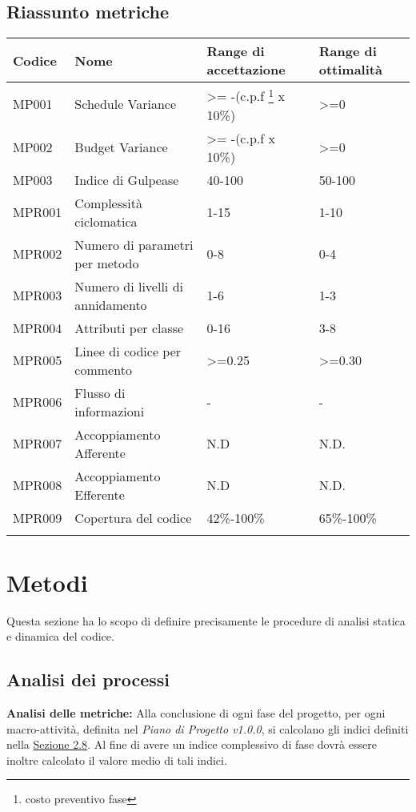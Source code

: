 \subsection{Riassunto metriche}
\begin{center}
\begin{tabularx}{\textwidth}{|X|X|X|X|}

	\hline
	\textbf{Codice} & \textbf{Nome} & 	\textbf{Range di accettazione} & \textbf{Range di ottimalità}\\
	\endhead
	\hline
	MP001 & Schedule Variance& >= -(c.p.f \footnote{costo preventivo fase} x 10\%)& >=0  \\
	\hline
	MP002 & Budget Variance & >= -(c.p.f x 10\%)& >=0 \\
	\hline
	MP003 & Indice di Gulpease & 40-100 & 50-100\\
	\hline
	MPR001 & Complessità ciclomatica & 1-15 & 1-10 \\
	\hline
	MPR002 & Numero di parametri per metodo & 0-8 & 0-4 \\
	\hline
	MPR003 & Numero di livelli di annidamento & 1-6 & 1-3 \\
	\hline
	MPR004 & Attributi per classe & 0-16 & 3-8 \\
	\hline
	MPR005 & Linee di codice per commento & >=0.25 & >=0.30 \\
	\hline
	MPR006 & Flusso di informazioni & - & - \\
	\hline
	MPR007 & Accoppiamento Afferente & N.D & N.D. \\
	\hline
	MPR008 & Accoppiamento Efferente& N.D & N.D. \\
	\hline
	MPR009 & Copertura del codice & 42\%-100\% & 65\%-100\% \\
	\hline
	\caption{Tabella delle metriche}
\end{tabularx}
\end{center}

\section{Metodi}\label{Metodi}
Questa sezione ha lo scopo di definire precisamente le procedure di analisi statica e dinamica del codice.
\subsection{Analisi dei processi}
	 \textbf{Analisi delle metriche:} Alla conclusione di ogni fase del progetto, per ogni macro-attività, definita nel
	\textit{Piano di Progetto v1.0.0}, si calcolano gli indici definiti nella \hyperref[Metriche]{Sezione 2.8}. Al fine
	di avere un indice complessivo di fase dovrà essere inoltre calcolato il valore medio
	di tali indici.

